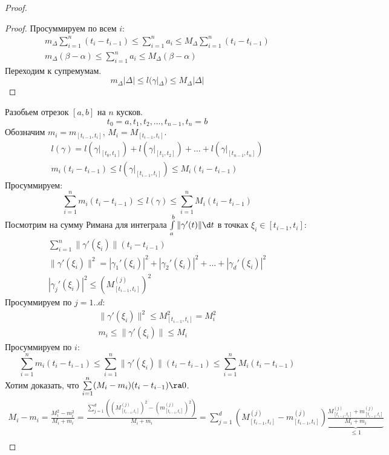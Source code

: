 \begin{proof}
\begin{proof}
		Просуммируем по всем $i$:
		\begin{gather*}
			m_{\Delta}\sum_{i=1}^n (t_i-t_{i-1}) \le \sum_{i=1}^n  a_i \le M_{\Delta} \sum_{i=1}^n (t_i-t_{i-1}) \\
			m_{\Delta}(\beta - \alpha) \le \sum_{i=1}^n a_i \le M_{\Delta}(\beta - \alpha)
		\end{gather*}
		Переходим к супремумам.
		\[ m_{\Delta} |\Delta| \le l(\gamma|_{\Delta}) \le M_{\Delta} |\Delta| \]
	\end{proof}
	Разобьем отрезок $[a, b]$ на $n$ кусков.
	\[ t_0 = a, t_1, t_2, \dots, t_{n-1}, t_n = b \]
	Обозначим $m_i = m_{[t_{i-1}, t_i]}$, $M_i = M_{[t_{i-1}, t_i]}$.
	\begin{gather*}
		l(\gamma) = l\left(\gamma\bigr|_{[t_0, t_1]}\right) + l\left(\gamma\bigr|_{[t_1, t_2]}\right) + \dots + l\left(\gamma\bigr|_{[t_{n - 1}, t_n]}\right) \\
		m_i(t_i - t_{i - 1}) \le l(\gamma|_{[t_{i - 1}, t_i]}) \le M_i(t_i - t_{i - 1})
	\end{gather*}
	Просуммируем:
	\[ \sum\limits_{i=1}^n m_i(t_i - t_{i-1}) \le l(\gamma) \le \sum\limits_{i=1}^n M_i(t_i - t_{i - 1}) \]
	Посмотрим на сумму Римана для интеграла $\int\limits_a^b \|\gamma'(t)\|\d t$ в точках $\xi_i \in [t_{i - 1}, t_i]$:
	\begin{gather*}
		\sum\limits_{i = 1}^n \|\gamma'(\xi_i)\| (t_i - t_{i - 1}) \\
		\|\gamma'(\xi_i)\|^2 = |\gamma_1'(\xi_i)|^2 + |\gamma_2'(\xi_i)|^2 + \dots + |\gamma_d'(\xi_i)|^2 \\
		|\gamma_j'(\xi_i)|^2 \le (M_{[t_{i - 1}, t_i]}^{(j)})^2
	\end{gather*}
	Просуммируем по $j = 1..d$:
	\begin{gather*}
		\|\gamma'(\xi_i)\|^2 \le M_{[t_{i - 1}, t_i]}^2 = M_i^2 \\
		m_i \le \|\gamma'(\xi_i)\| \le M_i
	\end{gather*}
	Просуммируем по $i$:
	\[
		\sum\limits_{i = 1}^n m_i(t_i - t_{i - 1}) \le
			\sum\limits_{i = 1}^n \|\gamma'(\xi_i)\| (t_i - t_{i - 1}) \le
			\sum\limits_{i = 1}^n M_i(t_i - t_{i - 1})
	\]
	Хотим доказать, что $\sum\limits_{i = 1}^n (M_i - m_i)(t_i - t_{i - 1}) \ra 0$.
	\begin{gather*}
		M_i - m_i = \frac{M_i^2 - m_i^2}{M_i + m_i} =
			\frac{\sum\limits_{j = 1}^d ((M_{[t_{i - 1}, t_{i}]}^{(j)})^2 - (m_{[t_{i - 1}, t_{i}]}^{(j)})^2)}{M_i + m_i} =
			\sum\limits_{j = 1}^d (M_{[t_{i - 1}, t_{i}]}^{(j)} - m_{[t_{i - 1}, t_{i}]}^{(j)})
			\underbrace{\frac{M_{[t_{i - 1}, t_{i}]}^{(j)} + m_{[t_{i - 1}, t_{i}]}^{(j)}}{M_i + m_i}}_{\le 1} \\

\end{gather*}
\end{proof}
